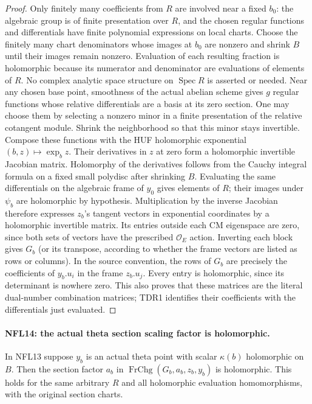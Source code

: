 \begin{proof}
Only finitely many coefficients from $R$ are involved near a
fixed $b_0$: the algebraic group is of finite presentation over
$R$, and the chosen regular functions and differentials have
finite polynomial expressions on local charts.  Choose the
finitely many chart denominators whose images at $b_0$ are
nonzero and shrink $B$ until their images remain nonzero.
Evaluation of each resulting fraction is holomorphic because
its numerator and denominator are evaluations of elements of
$R$.  No complex analytic space structure on
$\operatorname{Spec}R$ is asserted or needed.
Near any chosen base point, smoothness of the actual abelian
scheme gives $g$ regular functions whose relative differentials
are a basis at its zero section.  One may choose them by
selecting a nonzero minor in a finite presentation of the
relative cotangent module.  Shrink the neighborhood so that
this minor stays invertible.
Compose these functions with the HUF holomorphic exponential
$(b,z)\mapsto\exp_bz$.  Their derivatives in $z$ at zero form
a holomorphic invertible Jacobian matrix.  Holomorphy of the
derivatives follows from the Cauchy integral formula on a
fixed small polydisc after shrinking $B$.
Evaluating the same differentials on the algebraic frame of
$y_0$ gives elements of $R$; their images under $\psi_b$ are
holomorphic by hypothesis.  Multiplication by the inverse
Jacobian therefore expresses $z_b$'s tangent vectors in
exponential coordinates by a holomorphic invertible matrix.
Its entries outside each CM eigenspace are zero, since both
sets of vectors have the prescribed $\mathcal O_E$ action.
Inverting each block gives $G_b$ (or its transpose, according
to whether the frame vectors are listed as rows or columns).
In the source convention, the rows of $G_b$ are precisely the
coefficients of $y_b.u_i$ in the frame $z_b.u_j$.
Every entry is holomorphic, since its determinant is nowhere
zero.  This also proves that these matrices are the literal
dual-number combination matrices; TDR1 identifies their
coefficients with the differentials just evaluated.
\end{proof}

\paragraph{NFL14: the actual theta section scaling factor is holomorphic.}
\label{claim:NFL14}
In NFL13 suppose $y_b$ is an actual theta point with scalar
$\kappa(b)$ holomorphic on $B$.  Then the section factor $a_b$
in $\operatorname{FrChg}(G_b,a_b,z_b,y_b)$ is holomorphic.
This holds for the same arbitrary $R$ and all holomorphic
evaluation homomorphisms, with the original section charts.

